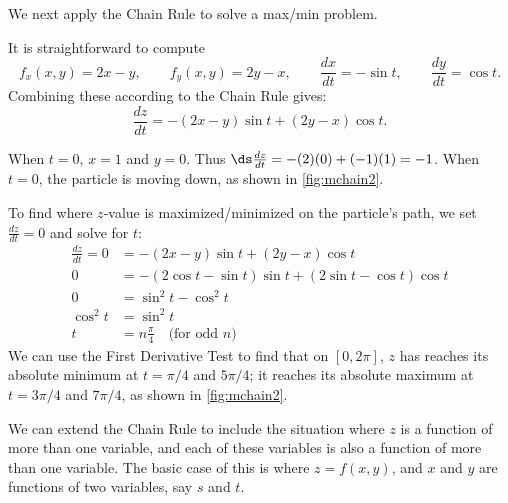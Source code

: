 We next apply the Chain Rule to solve a max/min problem.

{It is straightforward to compute
$$f_x(x,y) = 2x-y,\qquad f_y(x,y) = 2y-x,\qquad \frac{dx}{dt} = -\sin t,\qquad \frac{dy}{dt} = \cos t.$$
Combining these according to the Chain Rule gives:
$$\frac{dz}{dt} = -(2x-y)\sin t + (2y-x)\cos t.$$

When $t=0$, $x=1$ and $y=0$. Thus $\ds\frac{dz}{dt} = -(2)(0)+ (-1)(1) = -1$. When $t=0$, the particle is moving down, as shown in \autoref{fig:mchain2}. 

To find where $z$-value is maximized/minimized on the particle's path, we set $\frac{dz}{dt}=0$ and solve for $t$:
\begin{align*}
\frac{dz}{dt} =0 &= -(2x-y)\sin t + (2y-x)\cos t\\
			0&= -(2\cos t-\sin t)\sin t+(2\sin t-\cos t)\cos t\\
			0&= \sin^2t-\cos^2t\\
\cos^2t &=\sin^2t\\
	t&= n\frac{\pi}4\quad \text{(for odd $n$)}
\end{align*}
We can use the First Derivative Test to find that on $[0,2\pi]$, $z$ has reaches its absolute minimum at $t=\pi/4$ and $5\pi/4$; it reaches its absolute maximum at $t=3\pi/4$ and $7\pi/4$, as shown in \autoref{fig:mchain2}.}


We can extend the Chain Rule to include the situation where $z$ is a function of more than one variable, and each of these variables is also a function of more than one variable. The basic case of this is where $z=f(x,y)$, and $x$ and $y$ are functions of two variables, say $s$ and $t$.

